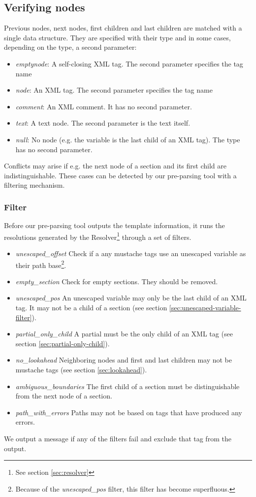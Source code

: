 \documentclass[thesis.tex]{subfiles}
\begin{document}
\subsection{Verifying nodes}
Previous nodes, next nodes, first children and last children are matched with
a single data structure.
They are specified with their type and in some cases, depending on the type,
a second parameter:
\begin{itemize}
\item \emph{emptynode}: A self-closing XML tag. The second parameter specifies
                        the tag name
\item \emph{node}:      An XML tag. The second parameter specifies
                        the tag name
\item \emph{comment}:   An XML comment. It has no second parameter.
\item \emph{text}:      A text node. The second parameter is the text itself.
\item \emph{null}:      No node (e.g. the variable is the
                        last child of an XML tag). The type has no second
                        parameter.
\end{itemize}

Conflicts may arise if e.g. the next node of a section and its first child are
indistinguishable. These cases can be detected by our pre-parsing tool with a
filtering mechanism.

\subsubsection{Filter}
\label{sec:filter}
Before our pre-parsing tool outputs the template information, it runs the
resolutions generated by the Resolver\footnote{See section \ref{sec:resolver}}
through a set of filters.
\begin{itemize}
\item \emph{unescaped\_offset}
	Check if a any mustache tags use an unescaped variable as their path
	base\footnote{Because of the \emph{unescaped\_pos} filter, this filter has
	become superfluous.}.
\item \emph{empty\_section}
	Check for empty sections. They should be removed.
\item \emph{unescaped\_pos}
	An unescaped variable may only be the last child
	of an XML tag. It may not be a child of a section
	(see section \ref{sec:unescaped-variable-filter}).
\item \emph{partial\_only\_child}
	A partial must be the only child of an XML tag
	(see section \ref{sec:partial-only-child}).
\item \emph{no\_lookahead}
	Neighboring nodes and first and last children may not
	be mustache tags (see section \ref{sec:lookahead}).
\item \emph{ambiguous\_boundaries}
	The first child of a section must be distinguishable from the next node of
	a section.
\item \emph{path\_with\_errors}
	Paths may not be based on tags that have produced any errors.
\end{itemize}
We output a message if any of the filters fail and exclude that tag from the
output.
\end{document}
